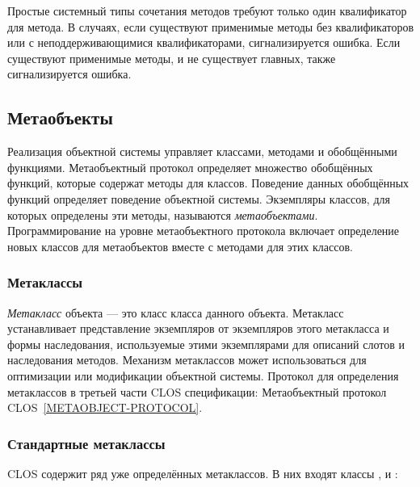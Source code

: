 Простые системный типы сочетания методов требуют только один квалификатор для
метода. В случаях, если существуют применимые методы без квалификаторов или с
неподдерживающимися квалификаторами, сигнализируется ошибка. Если существуют
применимые  методы, и не существует главных, также сигнализируется
ошибка.

\subsection{Метаобъекты}

Реализация объектной системы управляет классами, методами и обобщёнными
функциями. Метаобъектный протокол определяет множество обобщённых функций,
которые содержат методы для классов. Поведение данных обобщённых функций
определяет поведение объектной системы. Экземпляры классов, для которых
определены эти методы, называются \emph{метаобъектами}. Программирование на
уровне метаобъектного протокола включает определение новых классов для
метаобъектов вместе с методами для этих классов.

\subsubsection{Метаклассы}

\emph{Метакласс} объекта --- это класс класса данного объекта. Метакласс
устанавливает представление экземпляров от экземпляров этого метакласса и формы
наследования, используемые этими экземплярами для описаний слотов и наследования
методов. Механизм метаклассов может использоваться для оптимизации или
модификации объектной системы. Протокол для определения метаклассов в третьей
части CLOS спецификации: Метаобъектный протокол CLOS~\ref{METAOBJECT-PROTOCOL}.

\subsubsection{Стандартные метаклассы}

CLOS содержит ряд уже определённых метаклассов. В них входят классы
,  и :

